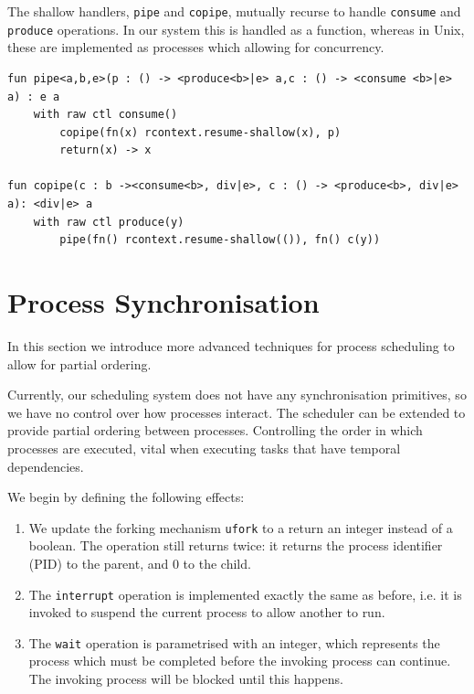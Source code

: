 \documentclass[logo,bsc,singlespacing,parskip]{infthesis}
\begin{document}
The shallow handlers, \lstinline{pipe} and \lstinline{copipe}, mutually recurse to handle \lstinline{consume} and \lstinline{produce} operations. In our system this is handled as a function, whereas in Unix, these are implemented as processes which allowing for concurrency.

\begin{lstlisting}
fun pipe<a,b,e>(p : () -> <produce<b>|e> a,c : () -> <consume <b>|e> a) : e a
    with raw ctl consume()
        copipe(fn(x) rcontext.resume-shallow(x), p)
        return(x) -> x

fun copipe(c : b -><consume<b>, div|e>, c : () -> <produce<b>, div|e> a): <div|e> a
    with raw ctl produce(y)
        pipe(fn() rcontext.resume-shallow(()), fn() c(y))
\end{lstlisting}

\section{Process Synchronisation}

In this section we introduce more advanced techniques for process scheduling to allow for partial ordering. 

Currently, our scheduling system does not have any synchronisation primitives, so we have no control over how processes interact. The scheduler can be extended to provide  partial ordering between processes. Controlling the order in which processes are executed, vital when executing tasks that have temporal dependencies. 

We begin by defining the following effects:


\begin{enumerate}
    \item We update the forking mechanism \lstinline{ufork} to a return an integer instead of a boolean. The operation still  returns twice: it returns the process identifier (PID) to the parent, and 0 to the child. 

    \item The \lstinline{interrupt} operation is implemented exactly the same as before, i.e. it is invoked to suspend the current process to allow another to run. 

    \item The \lstinline{wait} operation is parametrised with an integer, which represents the process which must be completed before the invoking process can continue. The invoking process will be blocked until this happens.
\end{enumerate}
\end{document}
